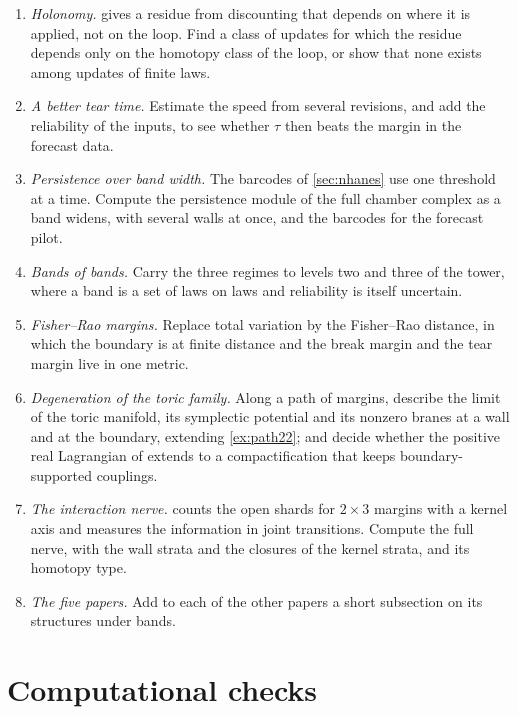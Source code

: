 \documentclass[11pt]{article}
\theoremstyle{definition}
\theoremstyle{remark}
\begin{document}
\begin{enumerate}[leftmargin=*]
\item \emph{Holonomy.}  gives a residue from discounting that depends on where it is applied, not on the loop. Find a class of updates for which the residue
  depends only on the homotopy class of the loop, or show that none exists among updates of finite laws.
\item \emph{A better tear time.} Estimate the speed from several revisions, and add the reliability of the inputs, to see whether
  $\tau$ then beats the margin in the forecast data.
\item \emph{Persistence over band width.} The barcodes of \cref{sec:nhanes} use one threshold at a time. Compute the persistence module of
  the full chamber complex as a band widens, with several walls at once, and the barcodes for the forecast pilot.
\item \emph{Bands of bands.} Carry the three regimes to levels two and three of the tower, where a band is a set of laws on laws and
  reliability is itself uncertain.
\item \emph{Fisher--Rao margins.} Replace total variation by the Fisher--Rao distance, in which the boundary is at finite distance and
  the break margin and the tear margin live in one metric.
\item \emph{Degeneration of the toric family.} Along a path of margins, describe the limit of the toric manifold, its symplectic potential
  and its nonzero branes at a wall and at the boundary, extending \cref{ex:path22}; and decide whether the positive real Lagrangian of
  \cite{Bridges} extends to a compactification that keeps boundary-supported couplings.
\item \emph{The interaction nerve.}  counts the open shards for $2\times3$ margins with a kernel axis and measures the
  information in joint transitions. Compute the full nerve, with the wall strata and the closures of the kernel strata, and its
  homotopy type.
\item \emph{The five papers.} Add to each of the other papers a short subsection on its structures under bands.
\end{enumerate}

\section{Computational checks}\label{sec:code}
\end{document}

